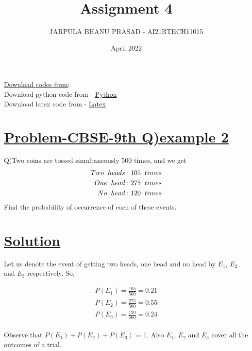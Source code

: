 \documentclass[journal,12pt,twocolumn]{IEEEtran}
\title{Assignment 4}
\author{JARPULA BHANU PRASAD - AI21BTECH11015}
\date{April 2022}
\begin{document}
\maketitle
\noindent \Large\underline{Download codes from}:\\
\noindent \large Download python code from - \href{https://github.com/jarpula-Bhanu/Assignment-4/blob/main/codes/probability.py}{Python}\\ Download latex code from - \href{}{Latex}
\section{\large\underline{Problem-CBSE-9th Q)example 2}}
\large \noindent Q)Two coins are tossed simultaneously 500 times, and we get
\begin{align*}
Two \hspace{2mm} heads : 105 \hspace{2mm} times \\
One \hspace{2mm} head : 275 \hspace{2mm} times \\
No \hspace{2mm} head : 120 \hspace{2mm} times
\end{align*}
Find the probability of occurrence of each of these events.

\section{\large\underline{Solution}}
\noindent Let us denote the event of getting two heads, one head and no head by $E_1$, $E_2$ and $E_3$ respectively. So,

\begin{align}
P(E_1) = \frac{105}{500} = 0.21 \\
P(E_2) = \frac{275}{500} = 0.55 \\
P(E_3) = \frac{120}{500} = 0.24
\end{align}\\
\noindent Observe that $P(E_1)+P(E_2)+P(E_3)$ = 1. Also $E_1$, $E_2$ and $E_3$ cover all the outcomes of a trial.
\end{document}
